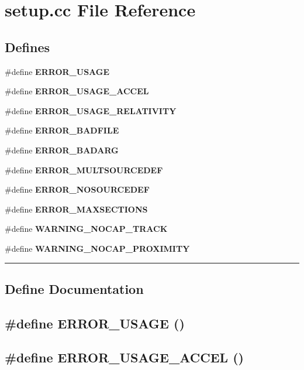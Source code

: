 \section{setup.cc File Reference}
\label{setup.cc}


\subsection*{Defines}
\begin{CompactItemize}
\item 
\#define {\bf ERROR\_\-USAGE}
\item 
\#define {\bf ERROR\_\-USAGE\_\-ACCEL}
\item 
\#define {\bf ERROR\_\-USAGE\_\-RELATIVITY}
\item 
\#define {\bf ERROR\_\-BADFILE}
\item 
\#define {\bf ERROR\_\-BADARG}
\item 
\#define {\bf ERROR\_\-MULTSOURCEDEF}
\item 
\#define {\bf ERROR\_\-NOSOURCEDEF}
\item 
\#define {\bf ERROR\_\-MAXSECTIONS}
\item 
\#define {\bf WARNING\_\-NOCAP\_\-TRACK}
\item 
\#define {\bf WARNING\_\-NOCAP\_\-PROXIMITY}
\end{CompactItemize}
\vspace{0.4cm}\hrule\vspace{0.2cm}
\subsection*{Define Documentation}
\label{setup.cc_a0}
\subsection{\setlength{\rightskip}{0pt plus 5cm}\#define ERROR\_\-USAGE ()}

\label{setup.cc_a1}
\subsection{\setlength{\rightskip}{0pt plus 5cm}\#define ERROR\_\-USAGE\_\-ACCEL ()}

\label{setup.cc_a2}
